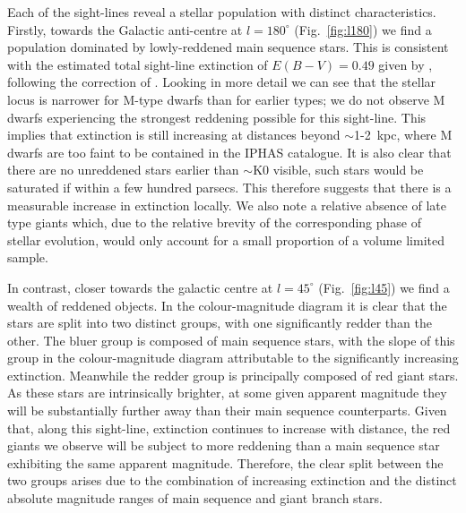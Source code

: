 \documentclass[useAMS,usenatbib]{mn2e}
\begin{document}
Each of the sight-lines reveal a stellar population
with distinct characteristics.
Firstly, towards the Galactic anti-centre 
at $l=180^\circ$ (Fig.~\ref{fig:l180})
we find a population dominated by lowly-reddened main sequence stars.
This is consistent with the estimated total sight-line extinction 
of $E(B-V)=0.49$ given by \cite{Schlegel1998},
following the correction of \cite{Schlafly2011}.
Looking in more detail we can see
that the stellar locus is narrower for M-type dwarfs
than for earlier types;
we do not observe M dwarfs experiencing 
the strongest reddening possible for this sight-line.
This implies that extinction is still increasing 
at distances beyond $\sim$1-2~kpc,
where M dwarfs are too faint to be contained in the IPHAS catalogue.
It is also clear that there are no unreddened stars
earlier than $\sim$K0 visible,
such stars would be saturated if within a few hundred parsecs.
This therefore suggests 
that there is a measurable increase in extinction locally.
We also note a relative absence of late type giants which,
due to the relative brevity 
of the corresponding phase of stellar evolution,
would only account for a small proportion of a volume limited sample.
 
In contrast, 
closer towards the galactic centre
at $l=45^{\circ}$ (Fig.~\ref{fig:l45})
we find a wealth of reddened objects.
In the colour-magnitude diagram it is clear
that the stars are split into two distinct groups,
with one significantly redder than the other.
The bluer group is composed of main sequence stars,
with the slope of this group in the colour-magnitude diagram
attributable to the significantly increasing extinction.
Meanwhile the redder group is principally composed of red giant stars.
As these stars are intrinsically brighter,
at some given apparent magnitude they will be substantially further away
than their main sequence counterparts.
Given that, along this sight-line,
extinction continues to increase with distance,
the red giants we observe will be subject to more reddening
than a main sequence star exhibiting the same apparent magnitude.
Therefore, the clear split between the two groups arises
due to the combination of increasing extinction
and the distinct absolute magnitude ranges
of main sequence and giant branch stars.
\end{document}
